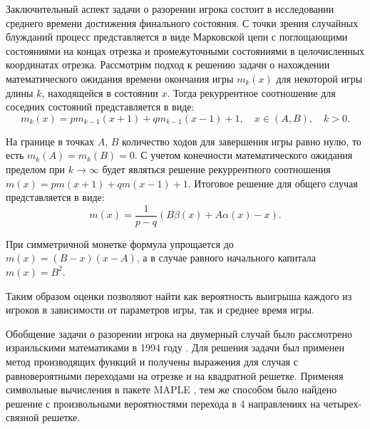 Заключительный аспект задачи о разорении игрока состоит в исследовании среднего времени достижения финального состояния. С точки зрения случайных блужданий процесс представляется в виде Марковской цепи с поглощающими состояниями на концах отрезка и промежуточными состояниями в целочисленных координатах отрезка. Рассмотрим подход к решению задачи о нахождении математического ожидания времени окончания игры $m_k(x)$ для некоторой игры длины $k$, находящейся в состоянии $x$. Тогда рекуррентное соотношение для соседних состояний представляется в виде:
\begin{equation}
    \label{eq:eq5}
    m_k(x) = p m_{k-1}\left (x + 1 \right ) + q m_{k-1}\left (x - 1 \right ) + 1, \quad x \in (A, B), \quad  k > 0.
\end{equation}

На границе в точках $A$, $B$ количество ходов для завершения игры равно нулю, то есть $m_k(A) = m_k(B) = 0$. С учетом конечности математического ожидания пределом при $k \xrightarrow{} \infty$ будет являться решение рекуррентного соотношения $m(x)=p m(x+1) +q m(x - 1) + 1$. Итоговое решение для общего случая представляется в виде:
\begin{equation}
    \label{eq:eq6}
    m(x) = \frac{1}{p - q} \left (B \beta(x) + A \alpha(x) - x \right ).
\end{equation}

При симметричной монетке формула упрощается до $m(x) = (B - x) (x - A)$, а в случае равного начального капитала $m(x) = B^2$.

Таким образом оценки позволяют найти как вероятность выигрыша каждого из игроков в зависимости от параметров игры, так и среднее время игры.

Обобщение задачи о разорении игрока на двумерный случай было рассмотрено израильскими математиками в 1994 году \cite{orr_computer_1994}. Для решения задачи был применен метод производящих функций и получены выражения для случая с равновероятными переходами на отрезке и на квадратной решетке. Применяя символьные вычисления в пакете MAPLE \cite{monagan2012maple}, тем же способом было найдено решение с произвольными вероятностями перехода в 4 направлениях на четырех-связной решетке. 

